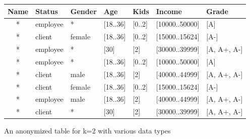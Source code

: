 \begin{figure}[H]
    \centering
    \small
    \begin{tabular}{c l l l l l l}
        \toprule
        \textbf{Name} & \textbf{Status} & \textbf{Gender} & \textbf{Age} & \textbf{Kids} & \textbf{Income} & \textbf{Grade} \\
        \midrule
        * & employee   & *      & [18..36] & [0..2] & [10000..50000] & [A] \\
        * & client     & female & [18..36] & [0..2] & [15000..15624] & [A-] \\
        * & employee   & *      & [30]     & [2]    & [30000..39999] & [A, A+, A-] \\
        * & employee   & *      & [18..36] & [0..2] & [10000..50000] & [A] \\
        * & client     & male   & [18..36] & [2]    & [40000..44999] & [A, A+, A-] \\
        * & client     & female & [18..36] & [0..2] & [15000..15624] & [A-] \\
        * & employee   & male   & [18..36] & [2]    & [40000..44999] & [A, A+, A-] \\
        * & client     & *      & [30]     & [2]    & [30000..39999] & [A, A+, A-] \\
        \bottomrule
    \end{tabular}
    \caption{An anonymized table for k=2 with various data types}\label{k-anonymized-table}
\end{figure}